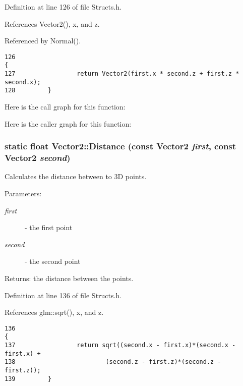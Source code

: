 Definition at line 126 of file Structs.h.

References Vector2(), x, and z.

Referenced by Normal().

\begin{Code}\begin{verbatim}126                                                                         {
127                 return Vector2(first.x * second.z + first.z * second.x);
128         }
\end{verbatim}
\end{Code}




Here is the call graph for this function:

Here is the caller graph for this function:\hypertarget{struct_vector2_80a99fd93db704d9b47f376a8568c86e}{
\subsubsection[Distance]{\setlength{\rightskip}{0pt plus 5cm}static float Vector2::Distance (const {\bf Vector2} {\em first}, \/  const {\bf Vector2} {\em second})}}
\label{struct_vector2_80a99fd93db704d9b47f376a8568c86e}


Calculates the distance between to 3D points. 

\begin{Desc}
\item[Parameters:]
\begin{description}
\item[{\em first}]- the first point \item[{\em second}]- the second point \end{description}
\end{Desc}
\begin{Desc}
\item[Returns:]the distance between the points. \end{Desc}


Definition at line 136 of file Structs.h.

References glm::sqrt(), x, and z.

\begin{Code}\begin{verbatim}136                                                                          {
137                 return sqrt((second.x - first.x)*(second.x - first.x) +
138                         (second.z - first.z)*(second.z - first.z));
139         }
\end{verbatim}
\end{Code}




